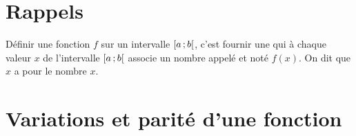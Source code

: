 \documentclass[12pt,a4paper]{article}
\date{}
\title{}
\begin{document}
	
	\section{Rappels}
	
	
	\begin{mydefs}
		
		Définir une fonction $f$ sur un intervalle $\mbox{\ensuremath{\left[a\mathpunct{};b\right[}}$, c'est fournir une  qui à chaque valeur $x$ de l'intervalle $\mbox{\ensuremath{\left[a\mathpunct{};b\right[}}$ associe un nombre appelé  et noté $f(x)$.
		On dit que $x$ a pour   le nombre $x$.
		
		
		
	\end{mydefs}
	
	
	
	
	\section{Variations et parité d'une fonction}
	
\end{document}
